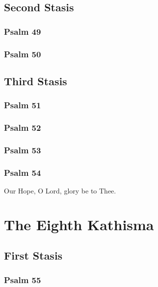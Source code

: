 \documentclass[12pt]{book}
\newcommand{\kathismabreak}{
  \medskip
  \begin{center}
  \begin{footnotesize}
  

  

  

  
  \end{footnotesize}
  \end{center}
  \smallbreak
}
\newcommand{\kathismaend}{
  \medskip
  \begin{center}
  \begin{footnotesize}
  

  

  Our Hope, O Lord, glory be to Thee.
  \end{footnotesize}
  \end{center}
  \smallbreak
}
\begin{document}
\kathismabreak

\subsection{Second Stasis}

\subsubsection{Psalm 49}


\subsubsection{Psalm 50}


\kathismabreak

\subsection{Third Stasis}

\subsubsection{Psalm 51}


\subsubsection{Psalm 52}


\subsubsection{Psalm 53}


\subsubsection{Psalm 54}


\kathismaend

\section{The Eighth Kathisma}

\subsection{First Stasis}

\subsubsection{Psalm 55}

\end{document}
